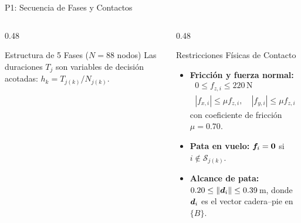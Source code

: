 \begin{frame}{P1: Secuencia de Fases y Contactos}
\begin{columns}[T]
\begin{column}{0.48\textwidth}
\begin{tbox}{Estructura de 5 Fases ($N=88$ nodos)}
\scriptsize
{}
\vskip4pt
Las duraciones $T_j$ son variables de decisión acotadas: $h_k = T_{j(k)}/N_{j(k)}$.
\end{tbox}
\end{column}

\begin{column}{0.48\textwidth}
\begin{tbox}{Restricciones Físicas de Contacto}
\small
\begin{itemize}
\item \textbf{Fricción y fuerza normal:}
\begin{gather*}
0 \le f_{z,i} \le 220\,\text{N}\\
|f_{x,i}| \le \mu f_{z,i},\quad |f_{y,i}| \le \mu f_{z,i}
\end{gather*}
con coeficiente de fricción $\mu = 0.70$.
\item \textbf{Pata en vuelo:} $\bm{f}_i = \mathbf{0}$ si $i \notin \mathcal{S}_{j(k)}$.
\item \textbf{Alcance de pata:} $0.20 \le \|\bm{d}_i\| \le 0.39$\,m, donde $\bm{d}_i$ es el vector cadera--pie en $\{B\}$.
\end{itemize}
\end{tbox}
\end{column}
\end{columns}
\end{frame}

